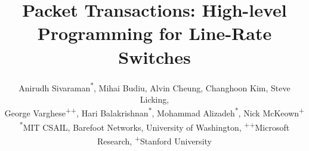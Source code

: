 \documentclass{sig-alternate-10pt}
\begin{document}
\date{}

\title{Packet Transactions: High-level Programming for Line-Rate Switches}
\author{
  \fontsize{10.7}{9.9}\rm Anirudh Sivaraman\textsuperscript{*}, Mihai Budiu\textsuperscript{\dag}, Alvin Cheung\textsuperscript{\ddag}, Changhoon Kim\textsuperscript{\dag}, Steve Licking\textsuperscript{\dag}, \\
  \fontsize{10.7}{9.9}\rm George Varghese\textsuperscript{++}, Hari Balakrishnan\textsuperscript{*}, Mohammad Alizadeh\textsuperscript{*}, Nick McKeown\textsuperscript{+}\\
\fontsize{10.7}{9.9}\selectfont \textsuperscript{*}MIT CSAIL, \textsuperscript{\dag}Barefoot Networks, \textsuperscript{\ddag}University of Washington, \textsuperscript{++}Microsoft Research, \textsuperscript{+}Stanford University
}

\maketitle







%



\balance



%
\end{document}
